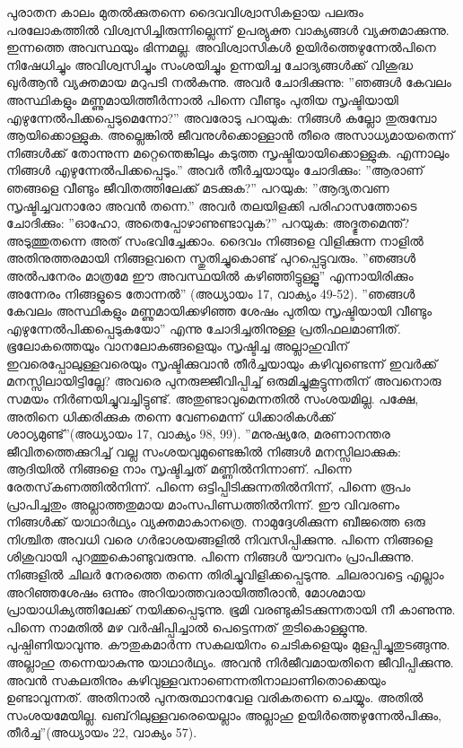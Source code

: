 പുരാതന കാലം മുതല്‍ക്കുതന്നെ ദൈവവിശ്വാസികളായ പലരും പരലോകത്തില്‍ വിശ്വസിച്ചിരുന്നില്ലെന്ന് ഉപര്യുക്ത വാക്യങ്ങള്‍ വ്യക്തമാക്കുന്നു. ഇന്നത്തെ അവസ്ഥയും ഭിന്നമല്ല. അവിശ്വാസികള്‍ ഉയിര്‍ത്തെഴുന്നേല്‍പിനെ നിഷേധിച്ചും അവിശ്വസിച്ചും സംശയിച്ചും ഉന്നയിച്ച ചോദ്യങ്ങള്‍ക്ക് വിശുദ്ധ ഖുര്‍ആന്‍ വ്യക്തമായ മറുപടി നല്‍കുന്നു. അവര്‍ ചോദിക്കുന്നു: ''ഞങ്ങള്‍ കേവലം അസ്ഥികളും മണ്ണുമായിത്തീര്‍ന്നാല്‍ പിന്നെ വീണ്ടും പുതിയ സൃഷ്ടിയായി എഴുന്നേല്‍പിക്കപ്പെടുമെന്നോ?'' അവരോടു പറയുക: നിങ്ങള്‍ കല്ലോ തുരുമ്പോ ആയിക്കൊള്ളുക. അല്ലെങ്കില്‍ ജീവനുള്‍ക്കൊള്ളാന്‍ തീരെ അസാധ്യമായതെന്ന് നിങ്ങള്‍ക്ക് തോന്നുന്ന മറ്റെന്തെങ്കിലും കടുത്ത സൃഷ്ടിയായിക്കൊള്ളുക. എന്നാലും നിങ്ങള്‍ എഴുന്നേല്‍പിക്കപ്പെടും.'' അവര്‍ തീര്‍ച്ചയായും ചോദിക്കും: ''ആരാണ് ഞങ്ങളെ വീണ്ടും ജീവിതത്തിലേക്ക് മടക്കുക?'' പറയുക: ''ആദ്യതവണ സൃഷ്ടിച്ചവനാരോ അവന്‍ തന്നെ.'' അവര്‍ തലയിളക്കി പരിഹാസത്തോടെ ചോദിക്കും: ''ഓഹോ, അതെപ്പോഴാണുണ്ടാവുക?'' പറയുക: അദ്ഭുതമെന്ത്? അടുത്തുതന്നെ അത് സംഭവിച്ചേക്കാം. ദൈവം നിങ്ങളെ വിളിക്കുന്ന നാളില്‍ അതിനുത്തരമായി നിങ്ങളവനെ സ്തുതിച്ചുകൊണ്ട് പുറപ്പെട്ടുവരും. ''ഞങ്ങള്‍ അല്‍പനേരം മാത്രമേ ഈ അവസ്ഥയില്‍ കഴിഞ്ഞിട്ടുള്ളൂ'' എന്നായിരിക്കും അന്നേരം നിങ്ങളുടെ തോന്നല്‍'' (അധ്യായം 17, വാക്യം 49-52).
''ഞങ്ങള്‍ കേവലം അസ്ഥികളും മണ്ണുമായിക്കഴിഞ്ഞ ശേഷം പുതിയ സൃഷ്ടിയായി വീണ്ടും എഴുന്നേല്‍പിക്കപ്പെടുകയോ'' എന്നു ചോദിച്ചതിനുള്ള പ്രതിഫലമാണിത്. ഭൂലോകത്തെയും വാനലോകങ്ങളെയും സൃഷ്ടിച്ച അല്ലാഹുവിന് ഇവരെപ്പോലുള്ളവരെയും സൃഷ്ടിക്കുവാന്‍ തീര്‍ച്ചയായും കഴിവുണ്ടെന്ന് ഇവര്‍ക്ക് മനസ്സിലായിട്ടില്ലേ? അവരെ പുനരുജ്ജീവിപ്പിച്ച് ഒരുമിച്ചുകൂട്ടുന്നതിന് അവനൊരു സമയം നിര്‍ണയിച്ചുവച്ചിട്ടുണ്ട്. അതുണ്ടാവുമെന്നതില്‍ സംശയമില്ല. പക്ഷേ, അതിനെ ധിക്കരിക്കുക തന്നെ വേണമെന്ന് ധിക്കാരികള്‍ക്ക് ശാഠ്യമുണ്ട്''(അധ്യായം 17, വാക്യം 98, 99).
''മനുഷ്യരേ, മരണാനന്തര ജീവിതത്തെക്കുറിച്ച് വല്ല സംശയവുമുണ്ടെങ്കില്‍ നിങ്ങള്‍ മനസ്സിലാക്കുക: ആദിയില്‍ നിങ്ങളെ നാം സൃഷ്ടിച്ചത് മണ്ണില്‍നിന്നാണ്. പിന്നെ രേതസ്‌കണത്തില്‍നിന്ന്. പിന്നെ ഒട്ടിപ്പിടിക്കുന്നതില്‍നിന്ന്, പിന്നെ രൂപം പ്രാപിച്ചതും അല്ലാത്തതുമായ മാംസപിണ്ഡത്തില്‍നിന്ന്. ഈ വിവരണം നിങ്ങള്‍ക്ക് യാഥാര്‍ഥ്യം വ്യക്തമാകാനത്രെ. നാമുദ്ദേശിക്കുന്ന ബീജത്തെ ഒരു നിശ്ചിത അവധി വരെ ഗര്‍ഭാശയങ്ങളില്‍ നിവസിപ്പിക്കുന്നു. പിന്നെ നിങ്ങളെ ശിശുവായി പുറത്തുകൊണ്ടുവരുന്നു. പിന്നെ നിങ്ങള്‍ യൗവനം പ്രാപിക്കുന്നു. നിങ്ങളില്‍ ചിലര്‍ നേരത്തെ തന്നെ തിരിച്ചുവിളിക്കപ്പെടുന്നു. ചിലരാവട്ടെ എല്ലാം അറിഞ്ഞശേഷം ഒന്നും അറിയാത്തവരായിത്തീരാന്‍, മോശമായ പ്രായാധിക്യത്തിലേക്ക് നയിക്കപ്പെടുന്നു. ഭൂമി വരണ്ടുകിടക്കുന്നതായി നീ കാണുന്നു. പിന്നെ നാമതില്‍ മഴ വര്‍ഷിപ്പിച്ചാല്‍ പെട്ടെന്നത് തുടികൊള്ളുന്നു. പുഷ്പിണിയാവുന്നു. കൗതുകമാര്‍ന്ന സകലയിനം ചെടികളെയും മുളപ്പിച്ചുതുടങ്ങുന്നു. അല്ലാഹു തന്നെയാകുന്നു യാഥാര്‍ഥ്യം. അവന്‍ നിര്‍ജീവമായതിനെ ജീവിപ്പിക്കുന്നു. അവന്‍ സകലതിനും കഴിവുള്ളവനാണെന്നതിനാലാണിതൊക്കെയും ഉണ്ടാവുന്നത്. അതിനാല്‍ പുനരുത്ഥാനവേള വരികതന്നെ ചെയ്യും. അതില്‍ സംശയമേയില്ല. ഖബ്‌റിലുള്ളവരെയെല്ലാം അല്ലാഹു ഉയിര്‍ത്തെഴുന്നേല്‍പിക്കും, തീര്‍ച്ച''(അധ്യായം 22, വാക്യം 57).
